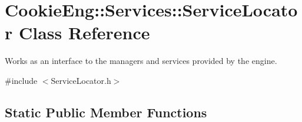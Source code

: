 \hypertarget{class_cookie_eng_1_1_services_1_1_service_locator}{}\section{Cookie\+Eng\+:\+:Services\+:\+:Service\+Locator Class Reference}
\label{class_cookie_eng_1_1_services_1_1_service_locator}


Works as an interface to the managers and services provided by the engine.  




{\ttfamily \#include $<$Service\+Locator.\+h$>$}

\subsection*{Static Public Member Functions}
